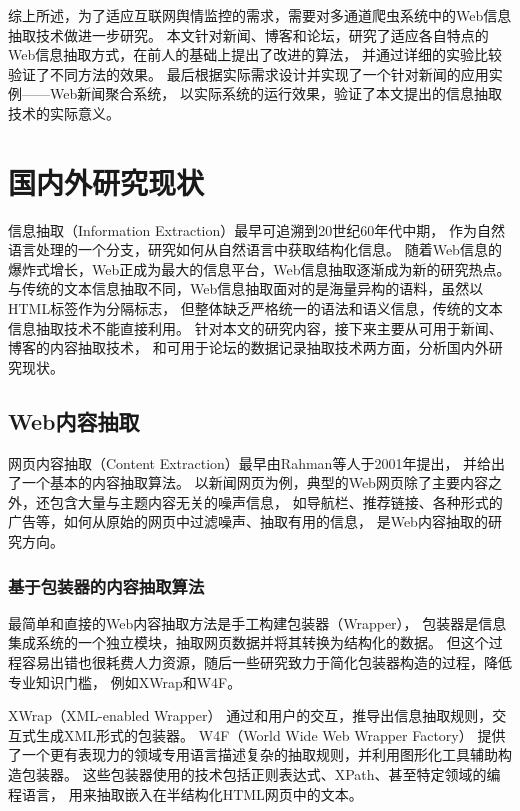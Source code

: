 综上所述，为了适应互联网舆情监控的需求，需要对多通道爬虫系统中的Web信息抽取技术做进一步研究。
本文针对新闻、博客和论坛，研究了适应各自特点的Web信息抽取方式，在前人的基础上提出了改进的算法，
并通过详细的实验比较验证了不同方法的效果。
最后根据实际需求设计并实现了一个针对新闻的应用实例——Web新闻聚合系统，
以实际系统的运行效果，验证了本文提出的信息抽取技术的实际意义。

\section{国内外研究现状}
信息抽取（Information Extraction）最早可追溯到20世纪60年代中期，
作为自然语言处理的一个分支，研究如何从自然语言中获取结构化信息。
随着Web信息的爆炸式增长，Web正成为最大的信息平台，Web信息抽取逐渐成为新的研究热点。
与传统的文本信息抽取不同，Web信息抽取面对的是海量异构的语料，虽然以HTML标签作为分隔标志，
但整体缺乏严格统一的语法和语义信息，传统的文本信息抽取技术不能直接利用。
针对本文的研究内容，接下来主要从可用于新闻、博客的内容抽取技术，
和可用于论坛的数据记录抽取技术两方面，分析国内外研究现状。

\subsection{Web内容抽取}
网页内容抽取（Content Extraction）最早由Rahman等人于2001年提出，
并给出了一个基本的内容抽取算法。
以新闻网页为例，典型的Web网页除了主要内容之外，还包含大量与主题内容无关的噪声信息，
如导航栏、推荐链接、各种形式的广告等，如何从原始的网页中过滤噪声、抽取有用的信息，
是Web内容抽取的研究方向。

\subsubsection{基于包装器的内容抽取算法}

最简单和直接的Web内容抽取方法是手工构建包装器（Wrapper），
包装器是信息集成系统的一个独立模块，抽取网页数据并将其转换为结构化的数据。
但这个过程容易出错也很耗费人力资源，随后一些研究致力于简化包装器构造的过程，降低专业知识门槛，
例如XWrap和W4F。

XWrap（XML-enabled Wrapper）
通过和用户的交互，推导出信息抽取规则，交互式生成XML形式的包装器。
W4F（World Wide Web Wrapper Factory）
提供了一个更有表现力的领域专用语言描述复杂的抽取规则，并利用图形化工具辅助构造包装器。
这些包装器使用的技术包括正则表达式、XPath、甚至特定领域的编程语言，
用来抽取嵌入在半结构化HTML网页中的文本。

